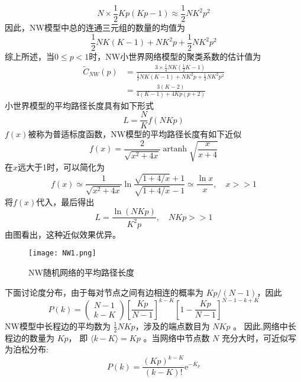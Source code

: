 \begin{equation}
    N \times \frac{1}{2} K p(K p-1) \approx \frac{1}{2} N K^2 p^2
\end{equation}
因此，NW模型中总的连通三元组的数量的均值为
\begin{equation}
    \frac{1}{2} N K(K-1)+N K^2 p+\frac{1}{2} N K^2 p^2
\end{equation}
综上所述，当$0 \leqslant p<1$时，NW小世界网络模型的聚类系数的估计值为
\begin{equation}
    \begin{aligned}
    \tilde{C}_{N W}(p) & =\frac{3 \times \frac{1}{4} N K\left(\frac{1}{2} K-1\right)}{\frac{1}{2} N K(K-1)+N K^2 p+\frac{1}{2} N K^2 p^2} \\
    & =\frac{3(K-2)}{4(K-1)+4 K p(p+2)} 
    \end{aligned}
\end{equation}
小世界模型的平均路径长度具有如下形式
\begin{equation}
    L=\frac{N}{K} f(N K p)
\end{equation}
$f(x)$被称为普适标度函数，NW模型的平均路径长度有如下近似
\begin{equation}
    f(x)=\frac{2}{\sqrt{x^2+4 x}} \operatorname{artanh} \sqrt{\frac{x}{x+4}}
\end{equation}
在$x$远大于1时，可以简化为
\begin{equation}
    f(x) \simeq \frac{1}{\sqrt{x^2+4 x}} \ln \frac{\sqrt{1+4 / x}+1}{\sqrt{1+4 / x}-1} \simeq \frac{\ln x}{x},\quad x>>1
\end{equation}
将$f(x)$代入，最后得出
\begin{equation}
    L=\frac{\ln (N K p)}{K^2 p},\quad N K p>>1
\end{equation}
由图看出，这种近似效果优异。\par
\begin{figure}[!htbp]
    \centering
    \texttt{[image: NW1.png]}
    \caption{NW随机网络的平均路径长度}
\end{figure}
下面讨论度分布，由于每对节点之间有边相连的概率为 $Kp/(N-1)$，因此
\begin{equation}
    P(k)=\left(\begin{array}{l}
    N-1 \\
    k-K
    \end{array}\right)\left[\frac{K p}{N-1}\right]^{k-K}\left[1-\frac{K p}{N-1}\right]^{N-1-k+K}
\end{equation}
NW模型中长程边的平均数为 $\frac{1}{2} N K p$，涉及的端点数目为 $N K p$ 。
因此,网络中长程边的数量为 $K p$，
即 $\langle k-K\rangle=K p$ 。当网络中节点数 $N$ 充分大时，可近似写为泊松分布:
\begin{equation}
    P(k)=\frac{(K p)^{k-K}}{(k-K) !} \mathrm{e}^{-K_p}
\end{equation}
